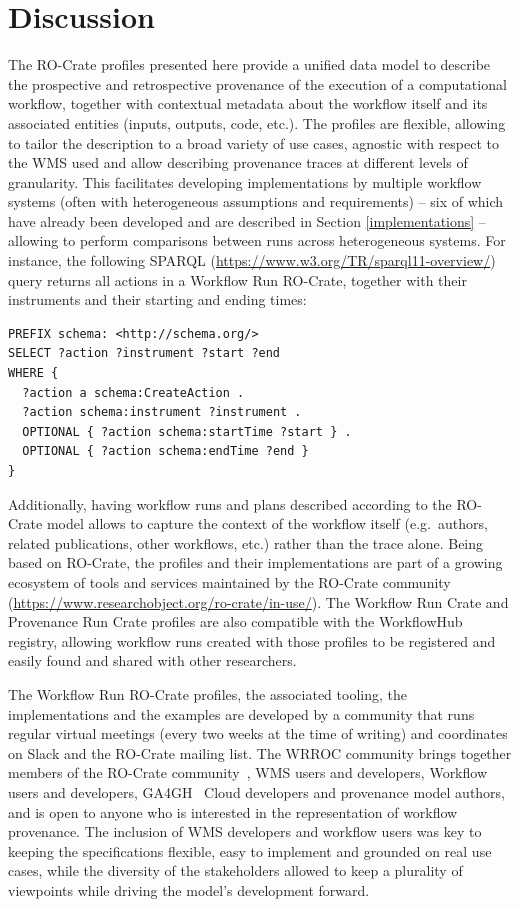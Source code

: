 \documentclass[10pt,letterpaper]{article}
\begin{document}
%
\section{Discussion}\label{discussion}


The RO-Crate profiles presented here provide a unified data model to describe the prospective and retrospective provenance of the execution of a computational workflow, together with contextual metadata about the workflow itself and its associated entities (inputs, outputs, code, etc.). 
The profiles are flexible, allowing to tailor the description to a broad variety of use cases, agnostic with respect to the WMS used and allow describing provenance traces at different levels of granularity. 
This facilitates developing implementations by multiple workflow systems (often with heterogeneous assumptions and requirements) -- six of which have already been developed and are described in Section \ref{implementations} -- allowing to perform comparisons between runs across heterogeneous systems.
For instance, the following SPARQL (\url{https://www.w3.org/TR/sparql11-overview/}) query returns all actions in a Workflow Run RO-Crate, together with their instruments and their starting and ending times:

\begin{verbatim}
PREFIX schema: <http://schema.org/>
SELECT ?action ?instrument ?start ?end
WHERE {
  ?action a schema:CreateAction .
  ?action schema:instrument ?instrument .
  OPTIONAL { ?action schema:startTime ?start } .
  OPTIONAL { ?action schema:endTime ?end }
}
\end{verbatim}

Additionally, having workflow runs and plans described according to the RO-Crate model allows to capture the context of the workflow itself (e.g.~authors, related publications, other workflows, etc.) rather than the trace alone. 
Being based on RO-Crate, the profiles and their implementations are part of a growing ecosystem of tools and services maintained by the RO-Crate community (\url{https://www.researchobject.org/ro-crate/in-use/}).
The Workflow Run Crate and Provenance Run Crate profiles are also compatible with the WorkflowHub registry, allowing workflow runs created with those profiles to be registered and easily found and shared with other researchers.

The Workflow Run RO-Crate profiles, the associated tooling, the implementations and the examples are developed by a community that runs regular virtual meetings (every two weeks at the time of writing) and coordinates on Slack and the RO-Crate mailing list.
The WRROC community brings together members of the RO-Crate community~\cite{Soiland-Reyes 2022a}, WMS users and developers, Workflow users and developers, GA4GH~\cite{Rehm 2021} Cloud developers and provenance model authors, and is open to anyone who is interested in the representation of workflow provenance.
The inclusion of WMS developers and workflow users was key to keeping the specifications flexible, easy to implement and grounded on real use cases, while the diversity of the stakeholders allowed to keep a plurality of viewpoints while driving the model's development forward.
\end{document}
